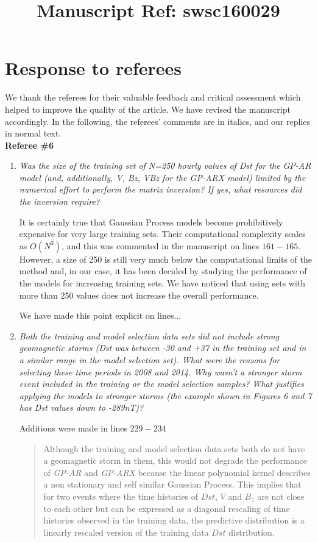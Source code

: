 \documentclass{article}
\begin{document}
\title{Manuscript Ref: swsc160029}
\maketitle

\section*{Response to referees}
We thank the referees for their valuable feedback and critical assessment which helped to improve the quality of the article. We have revised the manuscript accordingly. In the following, the referees' comments are in italics, and our replies in normal text.\\

\textbf{Referee \#6}
\begin{enumerate}
\item \emph{Was the size of the training set of N=250 hourly values of Dst for the GP-AR model (and, additionally, V, Bz, VBz for the GP-ARX model) limited by the numerical effort to perform the matrix inversion? If yes, what resources did the inversion require?}

It is certainly true that Gaussian Process models become prohibitively expensive for very large training sets. Their computational complexity scales as $O(N^3)$, and this was commented in the manuscript on lines $161-165$.
However, a size of 250 is still very much below the computational limits of the method and, in our case, it has been decided by studying the performance of the models for increasing training sets. We have noticed that using sets with more than 250 values does not increase the overall performance.

We have made this point explicit on lines...

\item \emph{Both the training and model selection data sets did not include strong geomagnetic storms (Dst was between -30 and +37 in the training set and in a similar range in the model selection set).
What were the reasons for selecting these time periods in 2008 and 2014.
Why wasn't a stronger storm event included in the training or the model selection samples?
What justifies applying the models to stronger storms (the example shown in Figures 6 and 7 has Dst values down to -289nT)?} 

Additions were made in lines $229-234$ \blockquote{Although the training and model selection data sets both do not have a geomagnetic storm in them, this would not degrade the performance of \emph{GP-AR} and \emph{GP-ARX} because the linear polynomial kernel describes a non stationary and self similar Gaussian Process. This implies that for two events where the time histories of $Dst$, $V$ and $B_z$ are not close to each other but can be expressed as a diagonal rescaling of time histories observed in the training data, the predictive distribution is a linearly rescaled version of the training data $Dst$ distribution.}


\end{enumerate}
\end{document}
